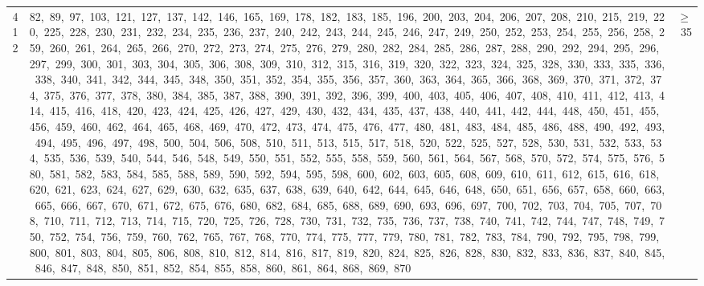 \begin{longtable}{c|p{}|r}
412 & 82,\ 89,\ 97,\ 103,\ 121,\ 127,\ 137,\ 142,\ 146,\ 165,\ 169,\ 178,\ 182,\ 183,\ 185,\ 196,\ 200,\ 203,\ 204,\ 206,\ 207,\ 208,\ 210,\ 215,\ 219,\ 220,\ 225,\ 228,\ 230,\ 231,\ 232,\ 234,\ 235,\ 236,\ 237,\ 240,\ 242,\ 243,\ 244,\ 245,\ 246,\ 247,\ 249,\ 250,\ 252,\ 253,\ 254,\ 255,\ 256,\ 258,\ 259,\ 260,\ 261,\ 264,\ 265,\ 266,\ 270,\ 272,\ 273,\ 274,\ 275,\ 276,\ 279,\ 280,\ 282,\ 284,\ 285,\ 286,\ 287,\ 288,\ 290,\ 292,\ 294,\ 295,\ 296,\ 297,\ 299,\ 300,\ 301,\ 303,\ 304,\ 305,\ 306,\ 308,\ 309,\ 310,\ 312,\ 315,\ 316,\ 319,\ 320,\ 322,\ 323,\ 324,\ 325,\ 328,\ 330,\ 333,\ 335,\ 336,\ 338,\ 340,\ 341,\ 342,\ 344,\ 345,\ 348,\ 350,\ 351,\ 352,\ 354,\ 355,\ 356,\ 357,\ 360,\ 363,\ 364,\ 365,\ 366,\ 368,\ 369,\ 370,\ 371,\ 372,\ 374,\ 375,\ 376,\ 377,\ 378,\ 380,\ 384,\ 385,\ 387,\ 388,\ 390,\ 391,\ 392,\ 396,\ 399,\ 400,\ 403,\ 405,\ 406,\ 407,\ 408,\ 410,\ 411,\ 412,\ 413,\ 414,\ 415,\ 416,\ 418,\ 420,\ 423,\ 424,\ 425,\ 426,\ 427,\ 429,\ 430,\ 432,\ 434,\ 435,\ 437,\ 438,\ 440,\ 441,\ 442,\ 444,\ 448,\ 450,\ 451,\ 455,\ 456,\ 459,\ 460,\ 462,\ 464,\ 465,\ 468,\ 469,\ 470,\ 472,\ 473,\ 474,\ 475,\ 476,\ 477,\ 480,\ 481,\ 483,\ 484,\ 485,\ 486,\ 488,\ 490,\ 492,\ 493,\ 494,\ 495,\ 496,\ 497,\ 498,\ 500,\ 504,\ 506,\ 508,\ 510,\ 511,\ 513,\ 515,\ 517,\ 518,\ 520,\ 522,\ 525,\ 527,\ 528,\ 530,\ 531,\ 532,\ 533,\ 534,\ 535,\ 536,\ 539,\ 540,\ 544,\ 546,\ 548,\ 549,\ 550,\ 551,\ 552,\ 555,\ 558,\ 559,\ 560,\ 561,\ 564,\ 567,\ 568,\ 570,\ 572,\ 574,\ 575,\ 576,\ 580,\ 581,\ 582,\ 583,\ 584,\ 585,\ 588,\ 589,\ 590,\ 592,\ 594,\ 595,\ 598,\ 600,\ 602,\ 603,\ 605,\ 608,\ 609,\ 610,\ 611,\ 612,\ 615,\ 616,\ 618,\ 620,\ 621,\ 623,\ 624,\ 627,\ 629,\ 630,\ 632,\ 635,\ 637,\ 638,\ 639,\ 640,\ 642,\ 644,\ 645,\ 646,\ 648,\ 650,\ 651,\ 656,\ 657,\ 658,\ 660,\ 663,\ 665,\ 666,\ 667,\ 670,\ 671,\ 672,\ 675,\ 676,\ 680,\ 682,\ 684,\ 685,\ 688,\ 689,\ 690,\ 693,\ 696,\ 697,\ 700,\ 702,\ 703,\ 704,\ 705,\ 707,\ 708,\ 710,\ 711,\ 712,\ 713,\ 714,\ 715,\ 720,\ 725,\ 726,\ 728,\ 730,\ 731,\ 732,\ 735,\ 736,\ 737,\ 738,\ 740,\ 741,\ 742,\ 744,\ 747,\ 748,\ 749,\ 750,\ 752,\ 754,\ 756,\ 759,\ 760,\ 762,\ 765,\ 767,\ 768,\ 770,\ 774,\ 775,\ 777,\ 779,\ 780,\ 781,\ 782,\ 783,\ 784,\ 790,\ 792,\ 795,\ 798,\ 799,\ 800,\ 801,\ 803,\ 804,\ 805,\ 806,\ 808,\ 810,\ 812,\ 814,\ 816,\ 817,\ 819,\ 820,\ 824,\ 825,\ 826,\ 828,\ 830,\ 832,\ 833,\ 836,\ 837,\ 840,\ 845,\ 846,\ 847,\ 848,\ 850,\ 851,\ 852,\ 854,\ 855,\ 858,\ 860,\ 861,\ 864,\ 868,\ 869,\ 870 & $\ge$ 35 \\

\end{longtable}
